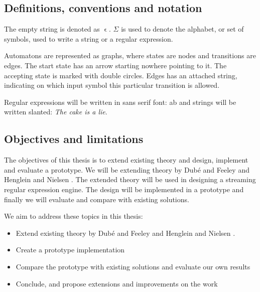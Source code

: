 



\subsection{Definitions, conventions and notation}

The empty string is denoted as $\upvarepsilon$. $\Sigma$ is used to
denote the alphabet, or set of symbols, used to write a string or a
regular expression. 

Automatons are represented as graphs, where states are nodes and
transitions are edges. The start state has an arrow starting nowhere
pointing to it. The accepting state is marked with double
circles. Edges has an attached string, indicating on which input
symbol this particular transition is allowed.

Regular expressions will be written in sans serif font:
\textsf{a\textbar b} and strings will be written slanted: \textsl{The
  cake is a lie}.


\subsection{Objectives and limitations}

The objectives of this thesis is to extend existing theory and design,
implement and evaluate a prototype. We will be extending theory by
Dub\'{e} and Feeley \cite{Dube2000} and Henglein and Nielsen
\cite{Henglein2010}. The extended theory will be used in designing a
streaming regular expression engine. The design will be implemented in
a prototype and finally we will evaluate and compare with existing
solutions.

We aim to address these topics in this thesis:

\begin{itemize}
\item Extend existing theory by Dub\'{e} and Feeley \cite{Dube2000}
  and Henglein and Nielsen \cite{Henglein2010}.

\item Create a prototype implementation

\item Compare the prototype with existing solutions and evaluate our own results

\item Conclude, and propose extensions and improvements on the work
\end{itemize}


